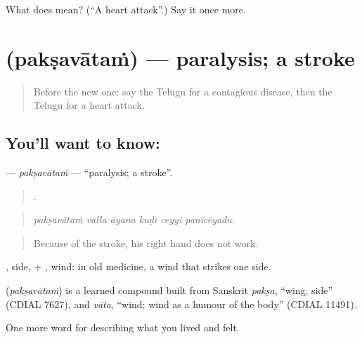 \begin{tcolorbox}[breakable,colback=teal!4,colframe=teal!35!black,title={Before you move on}]
What does  mean? (\textquotedblleft{}A heart attack\textquotedblright{}.) Say it once more.
\end{tcolorbox}
\section[\texorpdfstring{\te{పక్షవాతం} (pakṣavātaṁ)}{పక్షవాతం (pakṣavātaṁ)}]{ (pakṣavātaṁ) — paralysis; a stroke}

\label{lesson:TE-C513-paksavatam}



\begin{quote}
Before the new one: say the Telugu for a contagious disease, then the Telugu for a heart attack.
\end{quote}

\subsection*{You'll want to know: }
\textbf{} — \emph{pakṣavātaṁ} — \textquotedblleft{}paralysis; a stroke\textquotedblright{}.

\begin{quote}
     .
\end{quote}

\begin{quote}
\emph{pakṣavātaṁ valla āyana kuḍi ceyyi panicēyadu.}
\end{quote}

\begin{quote}
Because of the stroke, his right hand does not work.
\end{quote}

, side, + , wind: in old medicine, a wind that strikes one side.

\begin{cousinweb}
\textbf{} (\emph{pakṣavātaṁ}) is a learned compound built from Sanskrit \emph{pakṣa}, \textquotedblleft{}wing, side\textquotedblright{} (CDIAL 7627), and \emph{vāta}, \textquotedblleft{}wind; wind as a humour of the body\textquotedblright{} (CDIAL 11491).
\end{cousinweb}

\begin{grammarlens}[title={What you've built}]
One more word for describing what you lived and felt.
\end{grammarlens}

